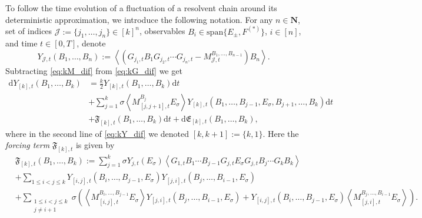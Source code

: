 \documentclass[10pt]{amsart}
\numberwithin{equation}{section}
\newcommand{\dif}{\mathrm{d}}
\newcommand{\N}{\mathbf{N}}
\begin{document}
To follow the time evolution of a fluctuation of a resolvent chain around its deterministic approximation, we introduce the following notation. For any $n\in \N$, set of indices $\mathcal{J}:=\{j_1,\ldots,j_n\}\in [k]^n$, observables $B_i\in \mathrm{span}\{E_\pm,F^{(*)}\}$, $i\in [n]$, and time $t\in[0,T]$, denote
\begin{equation}
Y_{\mathcal{J},t}(B_1,\ldots,B_n):=\left\langle \left(G_{j_1,t}B_1G_{j_2,t}\cdots G_{j_n,t} - M_{\mathcal{J},t}^{B_1,\ldots,B_{n-1}}\right)B_n\right\rangle.
\label{eq:def_Y_k}
\end{equation}
Subtracting \eqref{eq:kM_dif} from \eqref{eq:kG_dif} we get
\begin{equation}
\begin{split}
\dif Y_{[k],t}(B_1,\ldots,B_k)& = \frac{k}{2}Y_{[k],t}(B_1,\ldots,B_k) \dif t\\
&+ \sum_{j=1}^k \sigma \left\langle M_{[j,j+1],t}^{B_j}E_\sigma\right\rangle Y_{[k],t}(B_1,\ldots, B_{j-1},E_\sigma, B_{j+1},\ldots, B_k)\dif t\\
&+\mathfrak{F}_{[k],t}(B_1,\ldots,B_k)\dif t +\dif \mathfrak{E}_{[k],t}(B_1,\ldots,B_k),
\end{split}\label{eq:kY_dif}
\end{equation}
where in the second line of \eqref{eq:kY_dif} we denoted $[k,k+1]:=\{k,1\}$. Here the \emph{forcing term} $\mathfrak{F}_{[k],t}$ is given by
\begin{equation}
\begin{split}
&\mathfrak{F}_{[k],t}(B_1,\ldots,B_k):=\sum_{j=1}^k \sigma Y_{j,t}(E_\sigma)\left\langle G_{1,t}B_1\cdots B_{j-1}G_{j,t}E_\sigma G_{j,t} B_j\cdots G_kB_k\right\rangle\\
&+\sum_{1\le i<j\le k} Y_{[i,j],t}(B_i,\ldots,B_{j-1},E_\sigma)Y_{[j,i],t} (B_j,\ldots,B_{i-1},E_\sigma)\\
&+\sum_{\substack{1\le i<j\le k\\j\neq i+1}}\!\!\!\sigma\left( \!\left\langle\! M_{[i,j],t}^{B_i,\ldots,B_{j-1}}E_\sigma\!\right\rangle\! Y_{[j,i],t}(B_j,\ldots,B_{i-1},E_\sigma)\!+\! Y_{[i,j],t}(B_i,\ldots,B_{j-1},E_\sigma)\!\left\langle\! M_{[j,i],t}^{B_j,\ldots,B_{i-1}}E_\sigma\!\right\rangle\! \right)\!.
\end{split}
\label{eq:def_Fk}
\end{equation}
\end{document}
